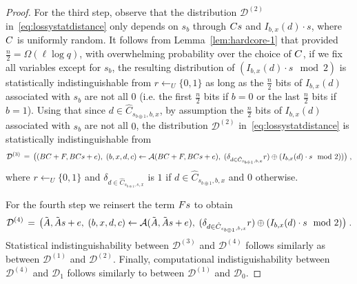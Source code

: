 \begin{proof}
For the third step, observe that the distribution $\mathcal{D}^{(2)}$ in~\eqref{eq:lossystatdistance} only depends on $s_b$ through $\*C\*s$ and $I_{b,x}(d)\cdot s$, where $\*C$ is uniformly random. It follows from Lemma~\ref{lem:hardcore-1} that provided $\frac{n}{2}=\Omega(\ell\log q)$, with overwhelming probability over the choice of $\*C$, if we fix all variables except for $s_b$, the resulting distribution of $(I_{b,x}(d) \cdot s \mod 2)$ is statistically indistinguishable from $r\leftarrow_U \{0,1\}$ as long as the $\frac{n}{2}$ bits of  $I_{b,x}(d)$ associated with $s_b$ are not all $0$ (i.e. the first $\frac{n}{2}$ bits if $b = 0$ or the last $\frac{n}{2}$ bits if $b = 1$). Using that since $d\in \hat{C}_{s_{b\oplus 1},b,x}$, by assumption the $\frac{n}{2}$ bits of  $I_{b,x}(d)$ associated with $s_b$ are not all $0$,  the distribution 
 $\mathcal{D}^{(2)}$ in~\eqref{eq:lossystatdistance} is statistically indistinguishable from 
\begin{eqnarray}\label{eq:distreplacewithr}
\mathcal{D}^{(3)} \,=\,\big( (\*B\*C+\*F, \*B\*C\*s + \*e),\; (b,x,d,c)\leftarrow \mathcal{A}(\*B\*C + \*F,\*B\*C\*s + \*e),\; (\delta_{d\in \hat{C}_{s_{b\oplus 1},b,x}} r )\oplus (I_{b,x}(d)\cdot s\mod 2))\big)\;, 
\end{eqnarray}
where $r\leftarrow_U \{0,1\}$ and $\delta_{d\in \hat{C}_{s_{b\oplus 1},s,x}}$ is $1$ if $d\in \hat{C}_{s_{b\oplus 1},b,x}$ and $0$ otherwise. %


For the fourth step we reinsert the term $F\*s$ to obtain
\begin{eqnarray}\label{eq:distbacktolossy}
\mathcal{D}^{(4)} \,=\, \big(\tilde{\*A}, \tilde{\*A}\*s + \*e,\; (b,x,d,c)\leftarrow \mathcal{A}(\tilde{\*A},\tilde{\*A}\*s + \*e),\; (\delta_{d\in \hat{C}_{s_{b\oplus 1},b,x}} r) \oplus (I_{b,x}(d) \cdot s\mod 2) \big)\;. 
\end{eqnarray}
Statistical indistinguishability between $\mathcal{D}^{(3)}$ and $\mathcal{D}^{(4)}$ follows similarly as between $\mathcal{D}^{(1)}$ and $\mathcal{D}^{(2)}$.
Finally, computational indistiguishability between $\mathcal{D}^{(4)}$ and $\mathcal{D}_1$ follows similarly to between $\mathcal{D}^{(1)}$ and $\mathcal{D}_0$.
\end{proof}



